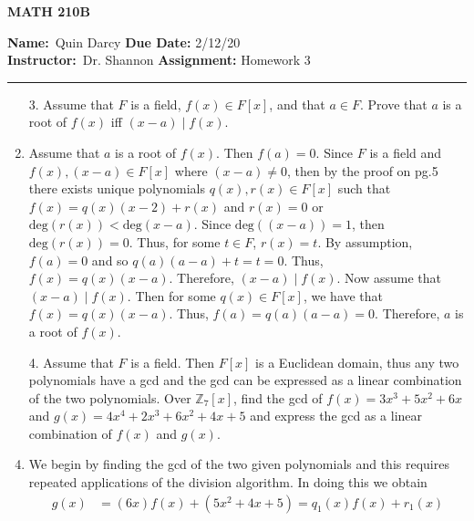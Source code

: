 \documentclass[12pt]{article}
\makeatletter
\theoremstyle{definition}
\theoremstyle{remark}
\renewenvironment{proof}[1][\proofname]{\par
  \pushQED{\qed}%
  \normalfont \topsep6\p@\@plus6\p@\relax
  \list{}{\leftmargin=0mm
          \rightmargin=4mm
          \settowidth{\itemindent}{\itshape#1}%
          \labelwidth=\itemindent
          \parsep=0pt \listparindent=\parindent 
  }
  \item[\hskip\labelsep
        \itshape
    #1\@addpunct{.}]\ignorespaces
}{%
  \popQED\endlist\@endpefalse
}
\newenvironment{solution}[1][\bf{\textit{Solution}}]{\par
  
  \normalfont \topsep6\p@\@plus6\p@\relax
  \list{}{\leftmargin=0mm
          \rightmargin=4mm
          \settowidth{\itemindent}{\itshape#1}%
          \labelwidth=\itemindent
          \parsep=0pt \listparindent=\parindent 
  }
  \item[\hskip\labelsep
        \itshape
    #1\@addpunct{.}]\ignorespaces
}{%
  \popQED\endlist\@endpefalse
}
\let\oldproofname=\proofname
\renewcommand{\proofname}{\bf{\textit{\oldproofname}}}
\makeatother
\begin{document}
\thispagestyle{empty}\hline

\begin{center}
	\vspace{.4cm} {\textbf { \large MATH 210B}}
\end{center}
{\textbf{Name:}\ Quin Darcy \hspace{\fill} \textbf{Due Date:} 2/12/20   \\
{ \textbf{Instructor:}}\ Dr. Shannon \hspace{\fill} \textbf{Assignment:} Homework 3 \\ \hrule}

\justifying

    \begin{enumerate}[leftmargin=*]
        \item[3.] Assume that $F$ is a field, $f(x)\in F[x]$, and that $a\in F$. Prove that $a$ is a root of $f(x)$ iff $(x-a)\mid f(x)$.
            \begin{proof}
                Assume that $a$ is a root of $f(x)$. Then $f(a)=0$. Since $F$ is a field and $f(x),(x-a)\in F[x]$ where $(x-a)\neq 0$, then by the proof on pg.5 there exists unique polynomials $q(x),r(x)\in F[x]$ such that $f(x)=q(x)(x-2)+r(x)$ and $r(x)=0$ or $\text{deg}(r(x))<\text{deg}(x-a)$. Since $\text{deg}((x-a))=1$, then $\text{deg}(r(x))=0$. Thus, for some $t\in F$, $r(x)=t$. By assumption, $f(a)=0$ and so $q(a)(a-a)+t=t=0$. Thus, $f(x)=q(x)(x-a)$. Therefore, $(x-a)\mid f(x)$. Now assume that $(x-a)\mid f(x)$. Then for some $q(x)\in F[x]$, we have that $f(x)=q(x)(x-a)$. Thus, $f(a)=q(a)(a-a)=0$. Therefore, $a$ is a root of $f(x)$.
            \end{proof}
        \item[4.] Assume that $F$ is a field. Then $F[x]$ is a Euclidean domain, thus any two polynomials have a gcd and the gcd can be expressed as a linear combination of the two polynomials. Over $\mathbb{Z}_7[x]$, find the gcd of $f(x)=3x^3+5x^2+6x$ and $g(x)=4x^4+2x^3+6x^2+4x+5$ and express the gcd as a linear combination of $f(x)$ and $g(x)$.
            \begin{solution}
                We begin by finding the gcd of the two given polynomials and this requires repeated applications of the division algorithm. In doing this we obtain
                    \begin{equation*}
                        \begin{split}
                            g(x) &=(6x)f(x)+(5x^2+4x+5)=q_1(x)f(x)+r_1(x) \\

\end{split}
\end{equation*}
\end{solution}
\end{enumerate}
\end{document}
